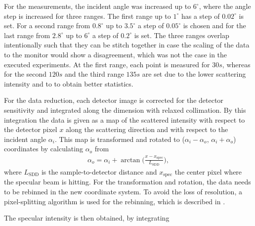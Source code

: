 \documentclass[\main/dresen_thesis.tex]{subfiles}
\begin{document}
    For the measurements, the incident angle was increased up to $6 ^\circ$, where the angle step is increased for three ranges.
    The first range up to $1 ^\circ$ has a step of $0.02 ^\circ$ is set.
    For a second range from $0.8 ^\circ$ up to $3.5 ^\circ$ a step of $0.05 ^\circ$ is chosen and for the last range from $2.8 ^\circ$ up to $6 ^\circ$ a step of $0.2 ^\circ$ is set.
    The three ranges overlap intentionally such that they can be stitch together in case the scaling of the data to the monitor would show a disagreement, which was not the case in the executed experiments.
    At the first range, each point is measured for $30 \unit{s}$, whereas for the second $120 \unit{s}$ and the third range $135 \unit{s}$ are set due to the lower scattering intensity and to to obtain better statistics.

    For the data reduction, each detector image is corrected for the detector sensitivity and integrated along the dimension with relaxed collimation. 
    By this integration the data is given as a map of the scattered intensity with respect to the detector pixel $x$ along the scattering direction and with respect to the incident angle $\alpha_i$.
    This map is transformed and rotated to ($\alpha_i - \alpha_o$, $\alpha_i+\alpha_o$) coordinates by calculating $\alpha_o$ from
    \begin{align}
      \alpha_o = \alpha_i + \arctan \biggl( \frac{x - x_\mathrm{spec}}{L_\mathrm{SDD}} \biggr),
    \end{align}
    where $L_\mathrm{SDD}$ is the sample-to-detector distance and $x_\mathrm{spec}$ the center pixel where the specular beam is hitting.
    For the transformation and rotation, the data needs to be rebinned in the new coordinate system.
    To avoid the loss of resolution, a pixel-splitting algorithm is used for the rebinning, which is described in .

    The specular intensity is then obtained, by integrating 


\end{document}
